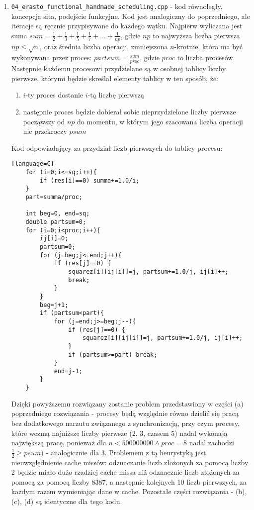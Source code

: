 \documentclass[12pt]{article}
\begin{document}
\begin {enumerate}
\begin{enumerate}
	\end{enumerate}
	\item \texttt{04\_erasto\_functional\_handmade\_scheduling.cpp} - kod równoległy, koncepcja sita, podejście funkcyjne. Kod jest analogiczny do poprzedniego, ale iteracje są ręcznie przypisywane do każdego wątku. Najpierw wyliczana jest suma \(sum=\frac{1}{2}+\frac{1}{3}+\frac{1}{5}+\frac{1}{7}+...+\frac{1}{np}\), gdzie \(np\) to najwyższa liczba pierwsza \(np\le\sqrt{n}\), oraz średnia liczba operacji, zmniejszona \(n\)-krotnie, która ma być wykonywana przez proces: \(partsum=\frac{sum}{proc}\), gdzie \(proc\) to liczba procesów. Następnie każdemu procesowi przydzielane są w osobnej tablicy liczby pierwsze, którymi będzie skreślał elementy tablicy w ten sposób, że:
	\begin{enumerate}
		\item \(i\)-ty proces dostanie \(i\)-tą liczbę pierwszą
		\item następnie proces będzie dobierał sobie nieprzydzielone liczby pierwsze począwszy od \(np\) do momentu, w którym jego szacowana liczba operacji nie przekroczy \(psum\)
	\end{enumerate}
	Kod odpowiadający za przydział liczb pierwszych do tablicy procesu:
	\begin{lstlisting}[style=mystyle, caption=  Ręczny scheduling sita funkcyjnego][language=C]
	for (i=0;i<=sq;i++){
		if (res[i]==0) summa+=1.0/i;
	}
	part=summa/proc;
	
	int beg=0, end=sq;
	double partsum=0;
	for (i=0;i<proc;i++){
		ij[i]=0;
		partsum=0;
		for (j=beg;j<=end;j++){
			if (res[j]==0) {
				squarez[i][ij[i]]=j, partsum+=1.0/j, ij[i]++;
				break;
			}
		}
		beg=j+1;
		if (partsum<part){
			for (j=end;j>=beg;j--){
				if (res[j]==0) {
					squarez[i][ij[i]]=j, partsum+=1.0/j, ij[i]++;
				}
				if (partsum>=part) break;
			}
			end=j-1;
		}
	}
	\end{lstlisting}
	Dzięki powyższemu rozwiązany zostanie problem przedstawiony w części (a) poprzedniego rozwiązania - procesy będą względnie równo dzielić się pracą bez dodatkowego narzutu związanego z synchronizacją, przy czym procesy, które wezmą najniższe liczby pierwsze (2, 3, czasem 5) nadal wykonają największą pracę, ponieważ dla \(n<500000000 \land proc=8\) nadal zachodzi \(\frac{1}{2}\ge psum)\) - analogicznie dla 3. Problemem z tą heurystyką jest nieuwzględnienie cache missów: odznaczanie liczb złożonych za pomocą liczby 2 będzie miało dużo rzadziej cache missa niż odznacznie liczb złożonych za pomocą za pomocą liczby 8387, a następnie kolejnych 10 liczb pierwszych, za każdym razem wymieniając dane w cache. Pozostałe części rozwiązania - (b), (c), (d) są identyczne dla tego kodu.
	

\end{enumerate}
\end{document}
